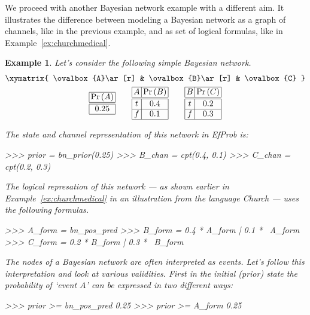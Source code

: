 \documentclass[leqno]{tufte-book} %
\newtheorem{example}[theorem]{Example}
\newcommand{\EfProb}{\textit{EfProb}\xspace}
\newcommand{\Prob}[1]{\mathrm{Pr}\left({#1}\right)}
\begin{document}
We proceed with another Bayesian network example with a different
aim. It illustrates the difference between modeling a Bayesian network
as a graph of channels, like in the previous example, and as set of
logical formulas, like in Example~\ref{ex:churchmedical}.


\begin{example}
\label{ex:bayesianmodeling}
Let's consider the following simple Bayesian network.
\begin{gather*}
\xymatrix{
\ovalbox{A}\ar[r] & \ovalbox{B}\ar[r] & \ovalbox{C}
}
\\
{\setlength\tabcolsep{0.2em}\begin{tabular}{|c|}
\hline
$\Prob{A}$ \\
\hline\hline
$0.25$ \\
\hline
\end{tabular}}
\qquad
{\setlength\tabcolsep{0.2em}\begin{tabular}{|c|c|}
\hline
$A$ & $\Prob{B}$ \\
\hline\hline
$t$ & $0.4$ \\
\hline
$f$ & $0.1$ \\
\hline
\end{tabular}}
\qquad
{\setlength\tabcolsep{0.2em}\begin{tabular}{|c|c|}
\hline
$B$ & $\Prob{C}$ \\
\hline\hline
$t$ & $0.2$ \\
\hline
$f$ & $0.3$ \\
\hline
\end{tabular}}
\end{gather*}

\noindent The state and channel representation of this network in
\EfProb is:
\begin{python}
>>> prior = bn_prior(0.25)
>>> B_chan = cpt(0.4, 0.1)
>>> C_chan = cpt(0.2, 0.3)
\end{python}

\noindent The \emph{logical} represation of this network --- as shown
earlier in Example~\ref{ex:churchmedical} in an illustration from the
language Church\cite{GoodmanMRBT08} --- uses the
following formulas.
\begin{python}
>>> A_form = bn_pos_pred
>>> B_form = 0.4 * A_form | 0.1 * ~A_form
>>> C_form = 0.2 * B_form | 0.3 * ~B_form
\end{python}

The nodes of a Bayesian network are often interpreted as events.
Let's follow this interpretation and look at various validities.
First in the initial (prior) state the probability of `event $A$' can
be expressed in two different ways:
\begin{python}
>>> prior >= bn_pos_pred
0.25
>>> prior >= A_form
0.25
\end{python}


\end{example}
\end{document}
